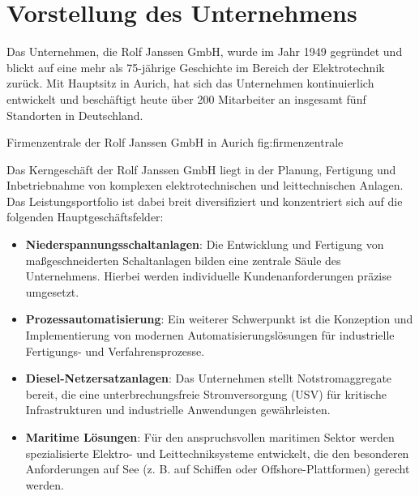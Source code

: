 
\section{Vorstellung des Unternehmens}\label{chap:vorstellung_unternehmen}

Das Unternehmen, die Rolf Janssen GmbH, wurde im Jahr 1949 gegründet und blickt auf eine mehr als 75-jährige Geschichte im Bereich der Elektrotechnik zurück. Mit Hauptsitz in Aurich, hat sich das Unternehmen kontinuierlich entwickelt und beschäftigt heute über 200 Mitarbeiter an insgesamt fünf Standorten in Deutschland.

 {Firmenzentrale der Rolf Janssen GmbH in Aurich} {fig:firmenzentrale}

Das Kerngeschäft der Rolf Janssen GmbH liegt in der Planung, Fertigung und Inbetriebnahme von komplexen elektrotechnischen und leittechnischen Anlagen. Das Leistungsportfolio ist dabei breit diversifiziert und konzentriert sich auf die folgenden Hauptgeschäftsfelder:

\begin{itemize} 
    \item \textbf{Niederspannungsschaltanlagen}: Die Entwicklung und Fertigung von maßgeschneiderten Schaltanlagen bilden eine zentrale Säule des Unternehmens. Hierbei werden individuelle Kundenanforderungen präzise umgesetzt. 
    \item \textbf{Prozessautomatisierung}: Ein weiterer Schwerpunkt ist die Konzeption und Implementierung von modernen Automatisierungslösungen für industrielle Fertigungs- und Verfahrensprozesse. 
    \item \textbf{Diesel-Netzersatzanlagen}: Das Unternehmen stellt Notstromaggregate bereit, die eine unterbrechungsfreie Stromversorgung (USV) für kritische Infrastrukturen und industrielle Anwendungen gewährleisten. 
    \item \textbf{Maritime Lösungen}: Für den anspruchsvollen maritimen Sektor werden spezialisierte Elektro- und Leittechniksysteme entwickelt, die den besonderen Anforderungen auf See (z. B. auf Schiffen oder Offshore-Plattformen) gerecht werden. 
\end{itemize}

